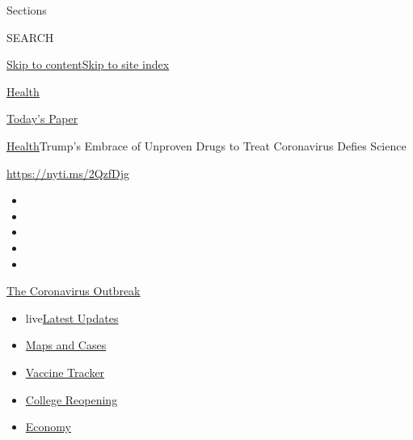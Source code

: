 Sections

SEARCH

\protect\hyperlink{site-content}{Skip to
content}\protect\hyperlink{site-index}{Skip to site index}

\href{https://www.nytimes3xbfgragh.onion/section/health}{Health}

\href{https://myaccount.nytimes3xbfgragh.onion/auth/login?response_type=cookie\&client_id=vi}{}

\href{https://www.nytimes3xbfgragh.onion/section/todayspaper}{Today's
Paper}

\href{/section/health}{Health}\textbar{}Trump's Embrace of Unproven
Drugs to Treat Coronavirus Defies Science

\url{https://nyti.ms/2QzfDjg}

\begin{itemize}
\item
\item
\item
\item
\item
\end{itemize}

\href{https://www.nytimes3xbfgragh.onion/news-event/coronavirus?action=click\&pgtype=Article\&state=default\&region=TOP_BANNER\&context=storylines_menu}{The
Coronavirus Outbreak}

\begin{itemize}
\tightlist
\item
  live\href{https://www.nytimes3xbfgragh.onion/2020/08/04/world/coronavirus-cases.html?action=click\&pgtype=Article\&state=default\&region=TOP_BANNER\&context=storylines_menu}{Latest
  Updates}
\item
  \href{https://www.nytimes3xbfgragh.onion/interactive/2020/us/coronavirus-us-cases.html?action=click\&pgtype=Article\&state=default\&region=TOP_BANNER\&context=storylines_menu}{Maps
  and Cases}
\item
  \href{https://www.nytimes3xbfgragh.onion/interactive/2020/science/coronavirus-vaccine-tracker.html?action=click\&pgtype=Article\&state=default\&region=TOP_BANNER\&context=storylines_menu}{Vaccine
  Tracker}
\item
  \href{https://www.nytimes3xbfgragh.onion/2020/08/02/us/covid-college-reopening.html?action=click\&pgtype=Article\&state=default\&region=TOP_BANNER\&context=storylines_menu}{College
  Reopening}
\item
  \href{https://www.nytimes3xbfgragh.onion/live/2020/08/04/business/stock-market-today-coronavirus?action=click\&pgtype=Article\&state=default\&region=TOP_BANNER\&context=storylines_menu}{Economy}
\end{itemize}


